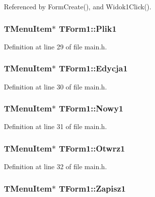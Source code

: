 Referenced by FormCreate(), and Widok1Click().\hypertarget{classTForm1_bab442b2f1649d0026ddbaab2b772a94}{
\subsubsection[Plik1]{\setlength{\rightskip}{0pt plus 5cm}TMenuItem$\ast$ {\bf TForm1::Plik1}}}
\label{classTForm1_bab442b2f1649d0026ddbaab2b772a94}




Definition at line 29 of file main.h.\hypertarget{classTForm1_380df144ba8d51b25de931a634bc6be2}{
\subsubsection[Edycja1]{\setlength{\rightskip}{0pt plus 5cm}TMenuItem$\ast$ {\bf TForm1::Edycja1}}}
\label{classTForm1_380df144ba8d51b25de931a634bc6be2}




Definition at line 30 of file main.h.\hypertarget{classTForm1_939bf0f4120695d5394e0cb2878683b2}{
\subsubsection[Nowy1]{\setlength{\rightskip}{0pt plus 5cm}TMenuItem$\ast$ {\bf TForm1::Nowy1}}}
\label{classTForm1_939bf0f4120695d5394e0cb2878683b2}




Definition at line 31 of file main.h.\hypertarget{classTForm1_5186111e79ab009942940b48a0df9038}{
\subsubsection[Otwrz1]{\setlength{\rightskip}{0pt plus 5cm}TMenuItem$\ast$ {\bf TForm1::Otwrz1}}}
\label{classTForm1_5186111e79ab009942940b48a0df9038}




Definition at line 32 of file main.h.\hypertarget{classTForm1_5fe7e2f7660a34d162b29f08e0542350}{
\subsubsection[Zapisz1]{\setlength{\rightskip}{0pt plus 5cm}TMenuItem$\ast$ {\bf TForm1::Zapisz1}}}
\label{classTForm1_5fe7e2f7660a34d162b29f08e0542350}





